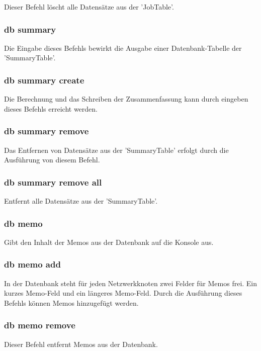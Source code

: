 \documentclass[12pt,a4paper]{report}
\begin{document}
Dieser Befehl löscht alle Datensätze aus der 'JobTable'.

\subsubsection{db summary}

Die Eingabe dieses Befehls bewirkt die Ausgabe einer Datenbank-Tabelle der 'SummaryTable'.

\subsubsection{db summary create}

Die Berechnung und das Schreiben der Zusammenfassung kann durch eingeben dieses Befehls erreicht werden.

\subsubsection{db summary remove}

Das Entfernen von Datensätze aus der 'SummaryTable' erfolgt durch die Ausführung von diesem Befehl.

\subsubsection{db summary remove all}

Entfernt alle Datensätze aus der 'SummaryTable'.

\subsubsection{db memo}

Gibt den Inhalt der Memos aus der Datenbank auf die Konsole aus.

\subsubsection{db memo add}

In der Datenbank steht für jeden Netzwerkknoten zwei Felder für Memos frei. Ein kurzes Memo-Feld und ein längeres Memo-Feld. Durch die Ausführung dieses Befehls können Memos hinzugefügt werden.

\subsubsection{db memo remove}

Dieser Befehl entfernt Memos aus der Datenbank.
\end{document}
